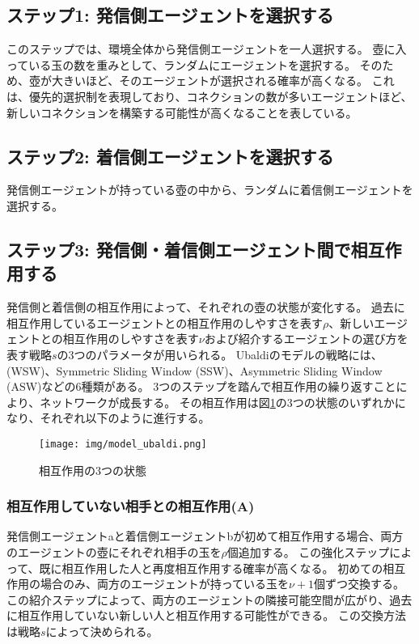 \documentclass[uplatex,11pt,openany]{ujreport}
\begin{document}
        \subsection*{ステップ1: 発信側エージェントを選択する}
        このステップでは、環境全体から発信側エージェントを一人選択する。
        壺に入っている玉の数を重みとして、ランダムにエージェントを選択する。
        そのため、壺が大きいほど、そのエージェントが選択される確率が高くなる。
        これは、優先的選択制を表現しており、コネクションの数が多いエージェントほど、新しいコネクションを構築する可能性が高くなることを表している。

        \subsection*{ステップ2: 着信側エージェントを選択する}
        発信側エージェントが持っている壺の中から、ランダムに着信側エージェントを選択する。

        \subsection*{ステップ3: 発信側・着信側エージェント間で相互作用する}
        発信側と着信側の相互作用によって、それぞれの壺の状態が変化する。
        過去に相互作用しているエージェントとの相互作用のしやすさを表す$\rho$、新しいエージェントとの相互作用のしやすさを表す$\nu$および紹介するエージェントの選び方を表す戦略$s$の3つのパラメータが用いられる。
        Ubaldiのモデルの戦略には、(WSW)、Symmetric Sliding Window (SSW)、Asymmetric Sliding Window (ASW)などの6種類がある。
        3つのステップを踏んで相互作用の繰り返すことにより、ネットワークが成長する。
        その相互作用は図\ref{fig:model_ubaldi}の3つの状態のいずれかになり、それぞれ以下のように進行する。

        \begin{figure}[htbp]
            \centering
            \texttt{[image: img/model\_ubaldi.png]}
            \caption{相互作用の3つの状態}
            \label{fig:model_ubaldi}
        \end{figure}


            \subsubsection*{相互作用していない相手との相互作用(A)}
            発信側エージェントaと着信側エージェントbが初めて相互作用する場合、両方のエージェントの壺にそれぞれ相手の玉を$\rho$個追加する。
            この強化ステップによって、既に相互作用した人と再度相互作用する確率が高くなる。
            初めての相互作用の場合のみ、両方のエージェントが持っている玉を$\nu+1$個ずつ交換する。
            この紹介ステップによって、両方のエージェントの隣接可能空間が広がり、過去に相互作用していない新しい人と相互作用する可能性ができる。
            この交換方法は戦略$s$によって決められる。
\end{document}
